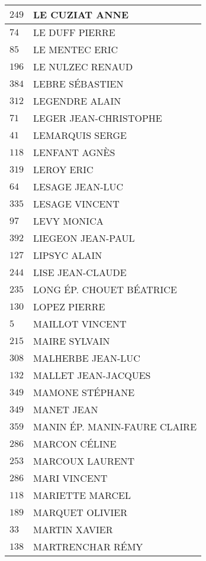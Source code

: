 \begin{xltabular}{\linewidth}{|l|X|}
    \hline
    $249$ & LE CUZIAT ANNE \\
    \hline
    $74$ & LE DUFF PIERRE \\
    \hline
    $85$ & LE MENTEC ERIC \\
    \hline
    $196$ & LE NULZEC RENAUD \\
    \hline
    $384$ & LEBRE SÉBASTIEN \\
    \hline
    $312$ & LEGENDRE ALAIN \\
    \hline
    $71$ & LEGER JEAN-CHRISTOPHE \\
    \hline
    $41$ & LEMARQUIS SERGE \\
    \hline
    $118$ & LENFANT AGNÈS \\
    \hline
    $319$ & LEROY ERIC \\
    \hline
    $64$ & LESAGE JEAN-LUC \\
    \hline
    $335$ & LESAGE VINCENT \\
    \hline
    $97$ & LEVY MONICA \\
    \hline
    $392$ & LIEGEON JEAN-PAUL \\
    \hline
    $127$ & LIPSYC ALAIN \\
    \hline
    $244$ & LISE JEAN-CLAUDE \\
    \hline
    $235$ & LONG ÉP. CHOUET BÉATRICE \\
    \hline
    $130$ & LOPEZ PIERRE \\
    \hline
    $5$ & MAILLOT VINCENT \\
    \hline
    $215$ & MAIRE SYLVAIN \\
    \hline
    $308$ & MALHERBE JEAN-LUC \\
    \hline
    $132$ & MALLET JEAN-JACQUES \\
    \hline
    $349$ & MAMONE STÉPHANE \\
    \hline
    $349$ & MANET JEAN \\
    \hline
    $359$ & MANIN ÉP. MANIN-FAURE CLAIRE \\
    \hline
    $286$ & MARCON CÉLINE \\
    \hline
    $253$ & MARCOUX LAURENT \\
    \hline
    $286$ & MARI VINCENT \\
    \hline
    $118$ & MARIETTE MARCEL \\
    \hline
    $189$ & MARQUET OLIVIER \\
    \hline
    $33$ & MARTIN XAVIER \\
    \hline
    $138$ & MARTRENCHAR RÉMY \\

\end{xltabular}
